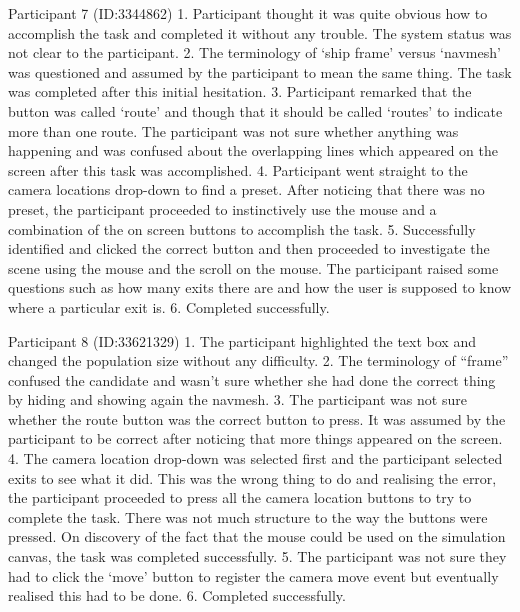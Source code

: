 \documentclass{article}
\begin{document}
Participant 7 (ID:3344862)
1. Participant thought it was quite obvious how to accomplish the task and completed it without any trouble. The system status was not clear to the participant.
2. The terminology of ‘ship frame’ versus ‘navmesh’ was questioned and assumed by the participant to mean the same thing. The task was completed after this initial hesitation.
3. Participant remarked that the button was called ‘route’ and though that it should be called ‘routes’ to indicate more than one route. The participant was not sure whether anything was happening and was confused about the overlapping lines which appeared on the screen after this task was accomplished.
4. Participant went straight to the camera locations drop-down to find a preset. After noticing that there was no preset, the participant proceeded to instinctively use the mouse and a combination of the on screen buttons to accomplish the task.
5. Successfully identified and clicked the correct button and then proceeded to investigate the scene using the mouse and the scroll on the mouse. The participant raised some questions such as how many exits there are and how the user is supposed to know where a particular exit is.
6. Completed successfully.

Participant 8 (ID:33621329)
1. The participant highlighted the text box and changed the population size without any difficulty.
2. The terminology of “frame” confused the candidate and wasn’t sure whether she had done the correct thing by hiding and showing again the navmesh.
3. The participant was not sure whether the route button was the correct button to press. It was assumed by the participant to be correct after noticing that more things appeared on the screen.
4. The camera location drop-down was selected first and the participant selected exits to see what it did. This was the wrong thing to do and realising the error, the participant proceeded to press all the camera location buttons to try to complete the task. There was not much structure to the way the buttons were pressed. On discovery of the fact that the mouse could be used on the simulation canvas, the task was completed successfully.
5. The participant was not sure they had to click the ‘move’ button to register the camera move event but eventually realised this had to be done.
6. Completed successfully. 

\end{document}
